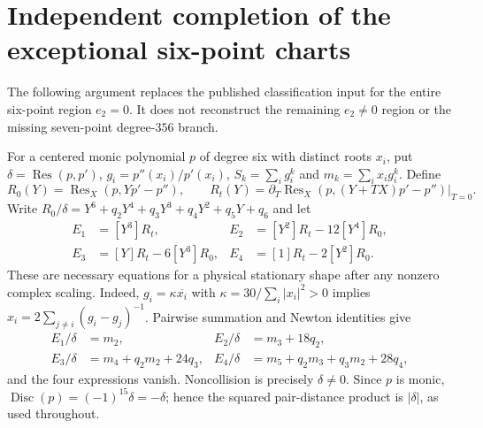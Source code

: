 \documentclass[11pt]{article}
\theoremstyle{remark}
\numberwithin{equation}{section}
\begin{document}
\section{Independent completion of the exceptional six-point charts}
\label{sec:six-special-independent}

The following argument replaces the published classification input for
the entire six-point region $e_2=0$. It does not reconstruct the remaining
$e_2\ne0$ region or the missing seven-point degree-$356$ branch.

For a centered monic polynomial $p$ of degree six with distinct roots
$x_i$, put $\delta=\operatorname{Res}(p,p')$,
$g_i=p''(x_i)/p'(x_i)$, $S_k=\sum_i g_i^k$ and
$m_k=\sum_i x_i g_i^k$. Define
\[
 R_0(Y)=\operatorname{Res}_X(p,Yp'-p''),\qquad
 R_t(Y)=\left.\partial_T\operatorname{Res}_X
 (p,(Y+TX)p'-p'')\right|_{T=0}.
\]
Write $R_0/\delta=Y^6+q_2Y^4+q_3Y^3+q_4Y^2+q_5Y+q_6$ and let
\begin{align*}
 E_1&=[Y^3]R_t,&E_2&=[Y^2]R_t-12[Y^4]R_0,\\
 E_3&=[Y]R_t-6[Y^3]R_0,&E_4&=[1]R_t-2[Y^2]R_0.
\end{align*}
These are necessary equations for a physical stationary shape after
any nonzero complex scaling. Indeed, $g_i=\kappa\overline{x_i}$ with
$\kappa=30/\sum_i|x_i|^2>0$ implies
$x_i=2\sum_{j\ne i}(g_i-g_j)^{-1}$.
Pairwise summation and Newton identities give
\begin{align*}
 E_1/\delta&=m_2,&E_2/\delta&=m_3+18q_2,\\
 E_3/\delta&=m_4+q_2m_2+24q_3,
 &E_4/\delta&=m_5+q_2m_3+q_3m_2+28q_4,
\end{align*}
and the four expressions vanish. Noncollision is precisely
$\delta\ne0$. Since $p$ is monic,
$\operatorname{Disc}(p)=(-1)^{15}\delta=-\delta$; hence the squared
pair-distance product is $|\delta|$, as used throughout.
\end{document}
